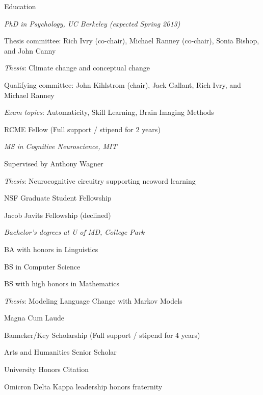 \begin{rubric}{Education}

\entry*[2007--present] \emph{PhD in Psychology, UC Berkeley (expected Spring
    2013)}
\par Thesis committee: Rich Ivry (co-chair), Michael Ranney (co-chair), Sonia
Bishop, and John Canny
\par \emph{Thesis}: Climate change and conceptual change
\par Qualifying committee: John Kihlstrom (chair), Jack Gallant, Rich Ivry, and
Michael Ranney
\par \emph{Exam topics}: Automaticity, Skill Learning, Brain Imaging Methods
\par RCME Fellow (Full support / stipend for 2 years)


\entry*[1999--2002] \emph{MS in Cognitive Neuroscience, MIT}
\par Supervised by Anthony Wagner
\par \emph{Thesis}: Neurocognitive circuitry supporting neoword learning
\par NSF Graduate Student Fellowship
\par Jacob Javits Fellowship (declined)




\entry*[1995--1999] \emph{Bachelor's degrees at U of MD, College Park}
\par BA with honors in Linguistics
\par BS in Computer Science
\par BS with high honors in Mathematics
\par \emph{Thesis}: Modeling Language Change with Markov Models
\par Magna Cum Laude
\par Banneker/Key Scholarship (Full support / stipend for 4 years)
\par Arts and Humanities Senior Scholar
\par University Honors Citation
\par Omicron Delta Kappa leadership honors fraternity

 

\end{rubric}
